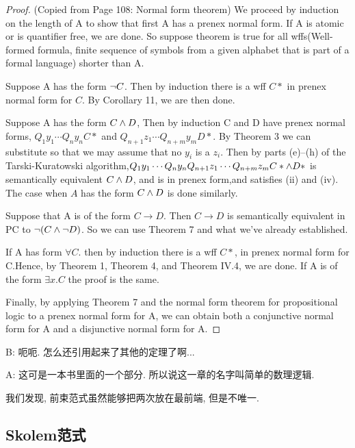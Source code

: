 \begin{proof}(Copied from Page 108: Normal form theorem)
	We proceed by induction on the length of A to show that first A has a prenex normal form. If A is atomic or is quantifier free, we are done. So suppose theorem is true for all wffs(Well-formed formula, finite sequence of symbols from a given alphabet that is part of a formal language) shorter than A.
	
	Suppose A has the form $\lnot C$. Then by induction there is a wff $C*$ in prenex normal form for $C$. By Corollary 11, we are then done.
	
	Suppose A has the form $C\land D$,  Then by induction C and D have prenex normal forms, $Q_1y_1\cdots Q_ny_n C*$ and $Q_{n+1}z_1\cdots Q_{n+m}y_m D*$. By Theorem 3 we can substitute so that we may assume that no $y_i$ is a $z_i$. Then by parts (e)–(h) of the Tarski-Kuratowski algorithm,$Q_1y_1\cdots Q_ny_n  Q_{n+1}z_1\cdots Q_{n+m}z_m C*\land D*$ is semantically equivalent $C\land D$, and is in prenex form,and satisfies (ii) and (iv). The case when $A$ has the form $C\land D$ is done similarly.
	
	Suppose that A is of the form $C\to D$. Then $C\to D$ is semantically equivalent in PC to $\lnot (C\land \lnot D)$. So we can use Theorem 7 and what we’ve already established.
	
	If A has form $\forall C.$ then by induction there is a wff $C*$, in prenex normal form for C.Hence, by Theorem 1, Theorem 4, and Theorem IV.4, we are done. If A is of the form $\exists x. C$ the proof is the same.
	
	Finally, by applying Theorem 7 and the normal form theorem for propositional logic to a prenex normal form for A, we can obtain both a conjunctive normal form for A and a disjunctive normal form for A.
\end{proof}

\begin{dialogue}
	B: 呃呃. 怎么还引用起来了其他的定理了啊...
	
	A: 这可是一本书里面的一个部分. 所以说这一章的名字叫简单的数理逻辑. 
\end{dialogue}




我们发现, 前束范式虽然能够把两次放在最前端, 但是不唯一. 

\subsection*{Skolem范式}


